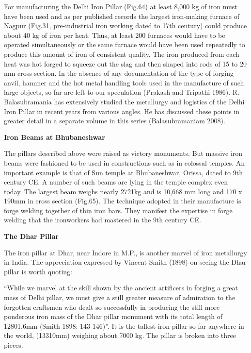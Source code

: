 For manufacturing the Delhi Iron Pillar (Fig.64) at least 8,000 kg of iron must have been used and as per published records the largest iron-making furnace of Nagpur (Fig.31, pre-industrial iron working dated to 17th century) could produce about 40 kg of iron per heat. Thus, at least 200 furnaces would have to be operated simultaneously or the same furnace would have been used repeatedly to produce this amount of iron of consistent quality. The iron produced from each heat was hot­ forged to squeeze out the slag and then shaped into rods of 15 to 20 mm cross-section. In the absence of any documentation of the type of forging anvil, hammer and the hot metal handling tools used in the manufacture of such large objects, so far are left to our speculation (Prakash and Tripathi 1986). R. Balasubramania has extensively studied the metallurgy and logistics of the Delhi Iron Pillar in recent years from various angles. He has discussed these points in greater detail in a separate volume in this series (Balasubramaniam 2008).

\textbf{Iron Beams at Bhubaneshwar}

The pillars described above were raised as victory monuments. But massive iron beams were fashioned to be used in constructions such as in colossal temples. An important example is that of Sun temple at Bhubaneshwar, Orissa, dated to 9th century CE. A number of such beams are lying in the temple complex even today. The largest beam weighs nearly 2721kg and is 10,668 mm long and 170 x 190mm in cross section (Fig.65). The technique adopted in their manufacture is forge welding together of thin iron bars. They manifest the expertise in forge welding that the ironworkers had mastered in the 9th century CE.

\textbf{The Dhar Pillar}

The iron pillar at Dhar, near Indore in M.P., is another marvel of iron metallurgy in India. The appreciation expressed by Vincent Smith (1898) on seeing the Dhar pillar is worth quoting:

``While we marvel at the skill shown by the ancient artificers in forging a great mass of Delhi pillar, we must give a still greater measure of admiration to the forgotten craftsmen who dealt so successfully in producing the still more ponderous iron mass of the Dhar pillar monument with its total length of 12801.6mm (Smith 1898: 143-146)''. It is the tallest iron pillar so far anywhere in the world, (13310mm) weighing about 7000 kg. The pillar is broken into three pieces.

